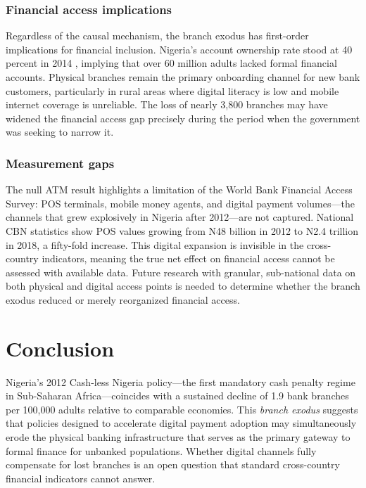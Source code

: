 \documentclass[12pt]{article}
\begin{document}
\subsubsection*{Financial access implications} Regardless of the causal mechanism, the branch exodus has first-order implications for financial inclusion. Nigeria's account ownership rate stood at 40 percent in 2014 \citep{demirguckunt2015measuring}, implying that over 60 million adults lacked formal financial accounts. Physical branches remain the primary onboarding channel for new bank customers, particularly in rural areas where digital literacy is low and mobile internet coverage is unreliable. The loss of nearly 3,800 branches may have widened the financial access gap precisely during the period when the government was seeking to narrow it.

\subsubsection*{Measurement gaps} The null ATM result highlights a limitation of the World Bank Financial Access Survey: POS terminals, mobile money agents, and digital payment volumes---the channels that grew explosively in Nigeria after 2012---are not captured. National CBN statistics show POS values growing from N48 billion in 2012 to N2.4 trillion in 2018, a fifty-fold increase. This digital expansion is invisible in the cross-country indicators, meaning the true net effect on financial access cannot be assessed with available data. Future research with granular, sub-national data on both physical and digital access points is needed to determine whether the branch exodus reduced or merely reorganized financial access.

\section{Conclusion}

Nigeria's 2012 Cash-less Nigeria policy---the first mandatory cash penalty regime in Sub-Saharan Africa---coincides with a sustained decline of 1.9 bank branches per 100,000 adults relative to comparable economies. This \textit{branch exodus} suggests that policies designed to accelerate digital payment adoption may simultaneously erode the physical banking infrastructure that serves as the primary gateway to formal finance for unbanked populations. Whether digital channels fully compensate for lost branches is an open question that standard cross-country financial indicators cannot answer.
\end{document}
